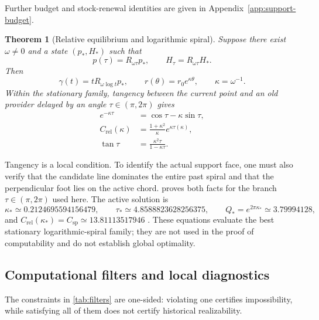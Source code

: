 \documentclass[10pt,a4paper]{article}
\newtheorem{theorem}{Theorem}[section]
\theoremstyle{definition}
\theoremstyle{remark}
\newcommand{\spc}{C_{\mathrm{sp}}}
\begin{document}
Further budget and stock-renewal identities are given in Appendix~\ref{app:support-budget}.

\begin{theorem}[Relative equilibrium and logarithmic spiral]
\label{thm:relative-equilibrium}
Suppose there exist $\omega\ne0$ and a state $(p_*,H_*)$ such that
\begin{equation}
p(\tau)=R_{\omega\tau}p_*,
\qquad
H_\tau=R_{\omega\tau}H_*.
\label{eq:relative-equilibrium}
\end{equation}
Then
\begin{equation}
\gamma(t)=tR_{\omega\log t}p_*,
\qquad
r(\theta)=r_0e^{\kappa\theta},
\qquad
\kappa=\omega^{-1}.
\label{eq:log-spiral}
\end{equation}
Within the stationary family, tangency between the current point and an old provider delayed by an angle $\tau\in(\pi,2\pi)$ gives
\begin{align}
e^{-\kappa\tau}&=\cos\tau-\kappa\sin\tau,
\label{eq:spiral-tangency}\\
C_{\mathrm{rel}}(\kappa)&=
\frac{1+\kappa^2}{\kappa}e^{\kappa\tau(\kappa)},
\label{eq:spiral-ratio}\\
\tan\tau&=\frac{\kappa^2\tau}{1-\kappa\tau}.
\label{eq:spiral-stationarity}
\end{align}
\end{theorem}

Tangency is a local condition. To identify the actual support face, one must also verify that the candidate line dominates the entire past spiral and that the perpendicular foot lies on the active chord.  proves both facts for the branch $\tau\in(\pi,2\pi)$ used here. The active solution is
\begin{equation}
\kappa_*\simeq0.2124695594156479,
\qquad
\tau_*\simeq4.8588823628256375,
\qquad
Q_*=e^{2\pi\kappa_*}\simeq3.79994128,
\label{eq:spiral-numerics}
\end{equation}
and $C_{\mathrm{rel}}(\kappa_*)=\spc\simeq13.81113517946$ \cite{FinchSpiral}. These equations evaluate the best stationary logarithmic-spiral family; they are not used in the proof of computability and do not establish global optimality.

\subsection{Computational filters and local diagnostics}
\label{sec:filters}
The constraints in \cref{tab:filters} are one-sided: violating one certifies impossibility, while satisfying all of them does not certify historical realizability.
\end{document}
